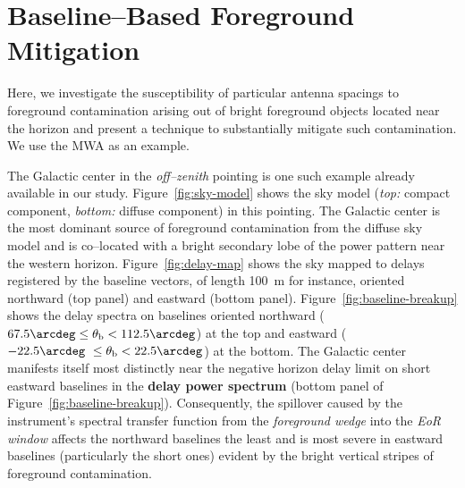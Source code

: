 \documentclass[preprint2,iop,numberedappendix,twocolappendix,appendixfloats]{emulateapj}
\begin{document}
\section{Baseline--Based Foreground Mitigation}\label{sec:fg-grading}

Here, we investigate the susceptibility of particular antenna spacings to foreground contamination arising out of bright foreground objects located near the horizon and present a technique to substantially mitigate such contamination. We use the MWA as an example.

The Galactic center in the {\it off--zenith} pointing is one such example already available in our study. Figure~\ref{fig:sky-model} shows the sky model ({\it top:} compact component, {\it bottom:} diffuse component) in this pointing. The Galactic center is the most dominant source of foreground contamination from the diffuse sky model and is co--located with a bright secondary lobe of the power pattern near the western horizon. Figure~\ref{fig:delay-map} shows the sky mapped to delays registered by the baseline vectors, of length 100~m for instance, oriented northward (top panel) and eastward (bottom panel). Figure~\ref{fig:baseline-breakup} shows the delay spectra on baselines oriented northward ($67.5\arcdeg\le \theta_\textrm{b} < 112.5\arcdeg$) at the top and eastward ($-22.5\arcdeg~\le \theta_\textrm{b} < 22.5\arcdeg$) at the bottom. The Galactic center manifests itself most distinctly near the negative horizon delay limit on short eastward baselines in the {\bf delay power spectrum} (bottom panel of Figure~\ref{fig:baseline-breakup}). Consequently, the spillover caused by the instrument's spectral transfer function from the {\it foreground wedge} into the {\it EoR window} affects the northward baselines the least and is most severe in eastward baselines (particularly the short ones) evident by the bright vertical stripes of foreground contamination. 
\end{document}
